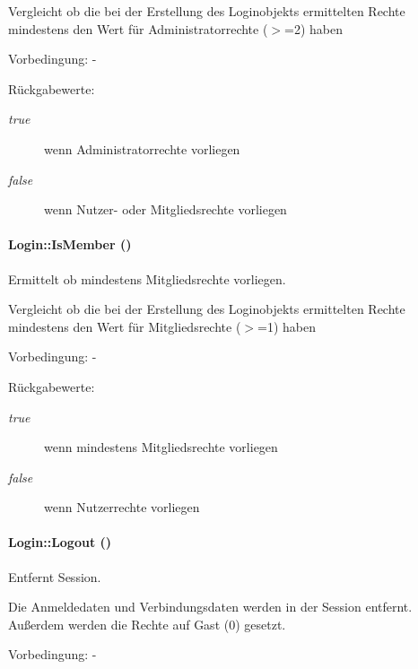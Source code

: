 Vergleicht ob die bei der Erstellung des Loginobjekts ermittelten Rechte mindestens den Wert für Administratorrechte ($>$=2) haben \begin{Desc}
\item[Vorbedingung:]- \end{Desc}
\begin{Desc}
\item[R\"{u}ckgabewerte:]
\begin{description}
\item[{\em true}]wenn Administratorrechte vorliegen \item[{\em false}]wenn Nutzer- oder Mitgliedsrechte vorliegen \end{description}
\end{Desc}
\hypertarget{classLogin_70d2747b0aa454f4203a789afea25318}{
\paragraph[IsMember]{\setlength{\rightskip}{0pt plus 5cm}Login::Is\-Member ()}\hfill}
\label{classLogin_70d2747b0aa454f4203a789afea25318}


Ermittelt ob mindestens Mitgliedsrechte vorliegen. 

Vergleicht ob die bei der Erstellung des Loginobjekts ermittelten Rechte mindestens den Wert für Mitgliedsrechte ($>$=1) haben \begin{Desc}
\item[Vorbedingung:]- \end{Desc}
\begin{Desc}
\item[R\"{u}ckgabewerte:]
\begin{description}
\item[{\em true}]wenn mindestens Mitgliedsrechte vorliegen \item[{\em false}]wenn Nutzerrechte vorliegen \end{description}
\end{Desc}
\hypertarget{classLogin_4cbf74bd382f34e863aec07c3eda0400}{
\paragraph[Logout]{\setlength{\rightskip}{0pt plus 5cm}Login::Logout ()}\hfill}
\label{classLogin_4cbf74bd382f34e863aec07c3eda0400}


Entfernt Session. 

Die Anmeldedaten und Verbindungsdaten werden in der Session entfernt. Außerdem werden die Rechte auf Gast (0) gesetzt. \begin{Desc}
\item[Vorbedingung:]- \end{Desc}
